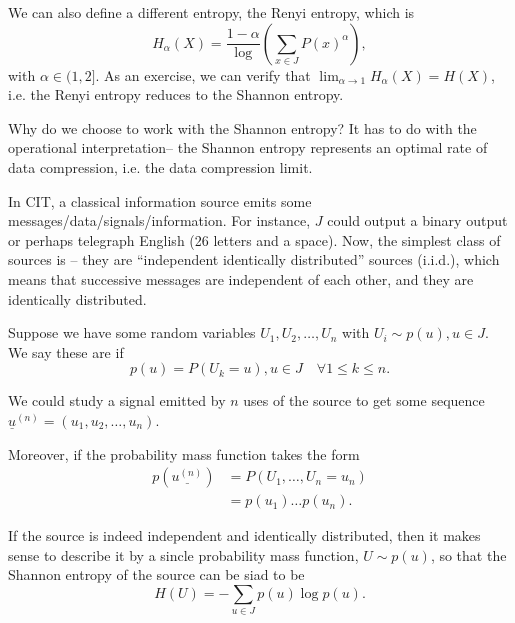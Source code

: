 \begin{defn}
    We can also define a different entropy, the Renyi entropy, which is
    \begin{equation}
        H_\alpha(X)=\frac{1-\alpha}\log (\sum_{x\in J}P(x)^\alpha),
    \end{equation}
    with $\alpha \in (1,2]$. As an exercise, we can verify that $\lim_{\alpha \to 1} H_\alpha(X) = H(X)$, i.e. the Renyi entropy reduces to the Shannon entropy.
\end{defn}

Why do we choose to work with the Shannon entropy? It has to do with the operational interpretation-- the Shannon entropy represents an optimal rate of data compression, i.e. the data compression limit.

In CIT, a classical information source emits some messages/data/signals/information. For instance, $J$ could output a binary output or perhaps telegraph English (26 letters and a space). Now, the simplest class of sources is -- they are ``independent identically distributed'' sources (i.i.d.), which means that successive messages are independent of each other, and they are identically distributed.

\begin{defn}
    Suppose we have some random variables $U_1,U_2,\ldots, U_n$ with $U_i \sim p(u),u\in J$. We say these are  if
    \begin{equation*}
        p(u)=P(U_k=u), u\in J \quad \forall 1\leq k \leq n.
    \end{equation*}
\end{defn}
We could study a signal emitted by $n$ uses of the source to get some sequence $\underline{u}^{(n)}=(u_1,u_2,\ldots, u_n)$.
\begin{defn}
    Moreover, if the probability mass function takes the form
    \begin{align*}
        p(\underline{u^{(n)}}) &=P(U_1,\ldots,U_n= u_n)\\
        &= p(u_1)\ldots p(u_n).
    \end{align*}
\end{defn}

If the source is indeed independent and identically distributed, then it makes sense to describe it by a sincle probability mass function, $U\sim p(u)$, so that the Shannon entropy of the source can be siad to be
\begin{equation}
    H(U)=-\sum_{u\in J} p(u) \log p(u).
\end{equation}

